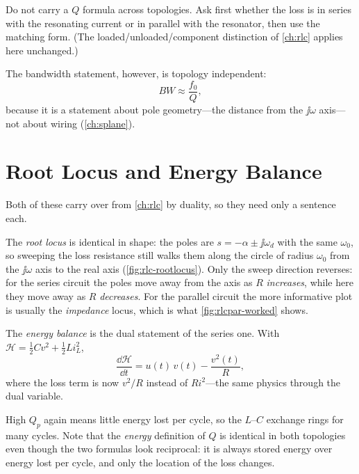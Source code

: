 \begin{mistakebox}
Do not carry a \(Q\) formula across topologies. Ask first whether the loss is in
series with the resonating current or in parallel with the resonator, then use the
matching form. (The loaded/unloaded/component distinction of \cref{ch:rlc} applies
here unchanged.)
\end{mistakebox}

The bandwidth statement, however, is topology independent:
\[
BW\approx\frac{f_0}{Q},
\]
because it is a statement about pole geometry---the distance from the
\(\jj\omega\) axis---not about wiring (\cref{ch:splane}).

\section{Root Locus and Energy Balance}
Both of these carry over from \cref{ch:rlc} by duality, so they need only a sentence
each.

The \emph{root locus} is identical in shape: the poles are
\(s=-\alpha\pm\jj\omega_d\) with the same \(\omega_0\), so sweeping the loss
resistance still walks them along the circle of radius \(\omega_0\) from the
\(\jj\omega\) axis to the real axis (\cref{fig:rlc-rootlocus}). Only the sweep
direction reverses: for the series circuit the poles move away from the axis as
\(R\) \emph{increases}, while here they move away as \(R\) \emph{decreases}. For the
parallel circuit the more informative plot is usually the \emph{impedance} locus,
which is what \cref{fig:rlcpar-worked} shows.

The \emph{energy balance} is the dual statement of the series one. With
\(\mathcal{H}=\tfrac12 Cv^2+\tfrac12 Li_L^2\),
\[
\frac{\dd\mathcal{H}}{\dd t}=u(t)\,v(t)-\frac{v^2(t)}{R},
\]
where the loss term is now \(v^2/R\) instead of \(Ri^2\)---the same physics through
the dual variable.

\begin{energybox}
High \(Q_p\) again means little energy lost per cycle, so the \(L\)--\(C\) exchange
rings for many cycles. Note that the \emph{energy} definition of \(Q\) is identical
in both topologies even though the two formulas look reciprocal: it is always
stored energy over energy lost per cycle, and only the location of the loss changes.
\end{energybox}

